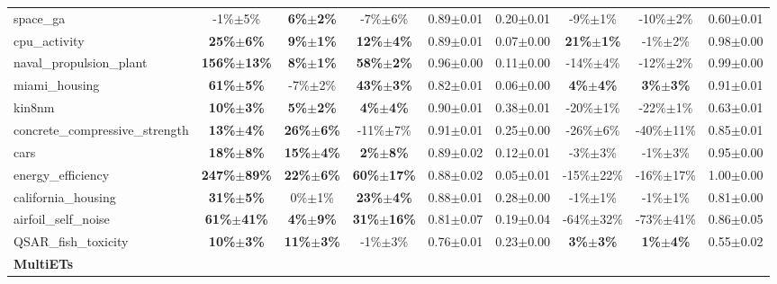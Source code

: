 \begin{table}[t]
\begin{small}
\begin{sc}
{\begin{tabular}{lcccccccc}
space\_ga  &  -1\%$\pm$5\%  &  \textbf{6\%$\pm$2\%}  &  -7\%$\pm$6\%  &  0.89$\pm$0.01  &  0.20$\pm$0.01  &  -9\%$\pm$1\%  &  -10\%$\pm$2\%  &  0.60$\pm$0.01 \\
cpu\_activity  &  \textbf{25\%$\pm$6\%}  &  \textbf{9\%$\pm$1\%}  &  \textbf{12\%$\pm$4\%}  &  0.89$\pm$0.01  &  0.07$\pm$0.00  &  \textbf{21\%$\pm$1\%}  &  -1\%$\pm$2\%  &  0.98$\pm$0.00 \\
naval\_propulsion\_plant  &  \textbf{156\%$\pm$13\%}  &  \textbf{8\%$\pm$1\%}  &  \textbf{58\%$\pm$2\%}  &  0.96$\pm$0.00  &  0.11$\pm$0.00  &  -14\%$\pm$4\%  &  -12\%$\pm$2\%  &  0.99$\pm$0.00 \\
miami\_housing  &  \textbf{61\%$\pm$5\%}  &  -7\%$\pm$2\%  &  \textbf{43\%$\pm$3\%}  &  0.82$\pm$0.01  &  0.06$\pm$0.00  &  \textbf{4\%$\pm$4\%}  &  \textbf{3\%$\pm$3\%}  &  0.91$\pm$0.01 \\
kin8nm  &  \textbf{10\%$\pm$3\%}  &  \textbf{5\%$\pm$2\%}  &  \textbf{4\%$\pm$4\%}  &  0.90$\pm$0.01  &  0.38$\pm$0.01  &  -20\%$\pm$1\%  &  -22\%$\pm$1\%  &  0.63$\pm$0.01 \\
concrete\_compressive\_strength  &  \textbf{13\%$\pm$4\%}  &  \textbf{26\%$\pm$6\%}  &  -11\%$\pm$7\%  &  0.91$\pm$0.01  &  0.25$\pm$0.00  &  -26\%$\pm$6\%  &  -40\%$\pm$11\%  &  0.85$\pm$0.01 \\
cars  &  \textbf{18\%$\pm$8\%}  &  \textbf{15\%$\pm$4\%}  &  \textbf{2\%$\pm$8\%}  &  0.89$\pm$0.02  &  0.12$\pm$0.01  &  -3\%$\pm$3\%  &  -1\%$\pm$3\%  &  0.95$\pm$0.00 \\
energy\_efficiency  &  \textbf{247\%$\pm$89\%}  &  \textbf{22\%$\pm$6\%}  &  \textbf{60\%$\pm$17\%}  &  0.88$\pm$0.02  &  0.05$\pm$0.01  &  -15\%$\pm$22\%  &  -16\%$\pm$17\%  &  1.00$\pm$0.00 \\
california\_housing  &  \textbf{31\%$\pm$5\%}  &  0\%$\pm$1\%  &  \textbf{23\%$\pm$4\%}  &  0.88$\pm$0.01  &  0.28$\pm$0.00  &  -1\%$\pm$1\%  &  -1\%$\pm$1\%  &  0.81$\pm$0.00 \\
airfoil\_self\_noise  &  \textbf{61\%$\pm$41\%}  &  \textbf{4\%$\pm$9\%}  &  \textbf{31\%$\pm$16\%}  &  0.81$\pm$0.07  &  0.19$\pm$0.04  &  -64\%$\pm$32\%  &  -73\%$\pm$41\%  &  0.86$\pm$0.05 \\
QSAR\_fish\_toxicity  &  \textbf{10\%$\pm$3\%}  &  \textbf{11\%$\pm$3\%}  &  -1\%$\pm$3\%  &  0.76$\pm$0.01  &  0.23$\pm$0.00  &  \textbf{3\%$\pm$3\%}  &  \textbf{1\%$\pm$4\%}  &  0.55$\pm$0.02 \\
\cmidrule(lr){1-9}
\textbf{MultiETs} & & & & & & & & \\ \cmidrule(lr){1-9}


\end{tabular}}
\end{sc}
\end{small}
\end{table}
